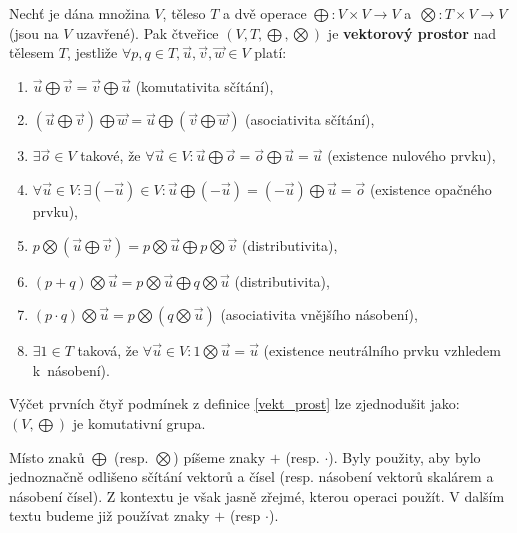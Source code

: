 \begin{definition}\label{vekt_prost}
    Nechť je dána množina $V$, těleso $T$ a dvě operace $\bigoplus: V\times V \to V$ a~$\bigotimes: T\times V \to V$ (jsou na $V$ uzavřené). Pak čtveřice $(V,T,\bigoplus,
    \bigotimes)$ je \textbf{vektorový prostor} nad tělesem $T$, jestliže $\forall p,q \in T, \vec u,
    \vec v, \vec w \in V$ platí:
    \begin{enumerate}[$i.$]
    \item $\vec u \bigoplus \vec v = \vec v \bigoplus \vec u$ (komutativita sčítání),
   	\item $(\vec u \bigoplus \vec v)\bigoplus \vec w = \vec u \bigoplus (\vec v \bigoplus \vec w)$ (asociativita sčítání),
   	\item $\exists \vec o\in V$ takové, že $\forall \vec u\in V:\vec u \bigoplus \vec o = \vec o \bigoplus \vec u = \vec u$ (existence nulového prvku),
   	\item $\forall \vec u \in V: \exists (-\vec u) \in V: \vec u \bigoplus (-\vec u) = (-\vec u) \bigoplus \vec u = \vec o$ (existence opačného prvku),
   	\item $p\bigotimes (\vec u \bigoplus \vec v)=p\bigotimes \vec u \bigoplus p\bigotimes \vec v$ (distributivita),
   	\item $(p+q)\bigotimes \vec u=p\bigotimes \vec u \bigoplus q\bigotimes \vec u$ (distributivita),
   	\item $(p\cdot q)\bigotimes \vec u = p\bigotimes (q\bigotimes \vec u)$ (asociativita vnějšího násobení),
   	\item $\exists 1 \in T$ taková, že $\forall \vec u \in V: 1\bigotimes \vec u = \vec u$ (existence neutrálního prvku vzhledem k~násobení).
    \end{enumerate}
\end{definition}

\begin{pozn}
    Výčet prvních čtyř podmínek z definice \ref{vekt_prost} lze zjednodušit jako:
    $(V,\bigoplus)$ je komutativní grupa.
\end{pozn}

\begin{pozn}
    Místo znaků $\bigoplus$ (resp. $\bigotimes$) píšeme znaky $+$ (resp. $\cdot$).
    Byly použity, aby bylo jednoznačně odlišeno sčítání vektorů a čísel (resp. násobení
    vektorů skalárem a násobení čísel). Z kontextu je však jasně zřejmé, kterou operaci
    použít. V dalším textu budeme již používat znaky $+$ (resp $\cdot$).
\end{pozn}

